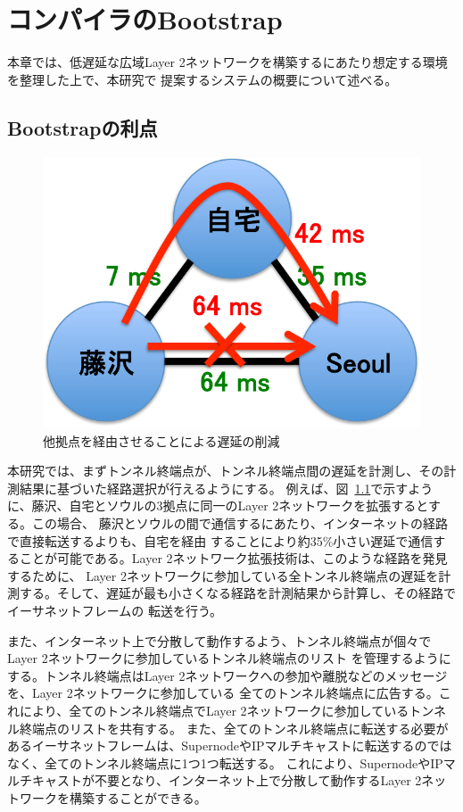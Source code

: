 \chapter{コンパイラのBootstrap}
\label{solv}

本章では、低遅延な広域Layer 2ネットワークを構築するにあたり想定する環境を整理した上で、本研究で
提案するシステムの概要について述べる。

\section{Bootstrapの利点}

\begin{figure}
	\begin{center}
		\includegraphics[scale=0.60]{./img/betterpath}
		\caption{他拠点を経由させることによる遅延の削減}
		\label{img:betterpath}
	\end{center}
\end{figure}

本研究では、まずトンネル終端点が、トンネル終端点間の遅延を計測し、その計測結果に基づいた経路選択が行えるようにする。
例えば、図~\ref{img:betterpath}で示すように、藤沢、自宅とソウルの3拠点に同一のLayer 2ネットワークを拡張するとする。この場合、
藤沢とソウルの間で通信するにあたり、インターネットの経路で直接転送するよりも、自宅を経由
することにより約35\%小さい遅延で通信することが可能である。Layer 2ネットワーク拡張技術は、このような経路を発見するために、
Layer 2ネットワークに参加している全トンネル終端点の遅延を計測する。そして、遅延が最も小さくなる経路を計測結果から計算し、その経路でイーサネットフレームの
転送を行う。

また、インターネット上で分散して動作するよう、トンネル終端点が個々でLayer 2ネットワークに参加しているトンネル終端点のリスト
を管理するようにする。トンネル終端点はLayer 2ネットワークへの参加や離脱などのメッセージを、Layer 2ネットワークに参加している
全てのトンネル終端点に広告する。これにより、全てのトンネル終端点でLayer 2ネットワークに参加しているトンネル終端点のリストを共有する。
また、全てのトンネル終端点に転送する必要があるイーサネットフレームは、SupernodeやIPマルチキャストに転送するのではなく、全てのトンネル終端点に1つ1つ転送する。
これにより、SupernodeやIPマルチキャストが不要となり、インターネット上で分散して動作するLayer 2ネットワークを構築することができる。


